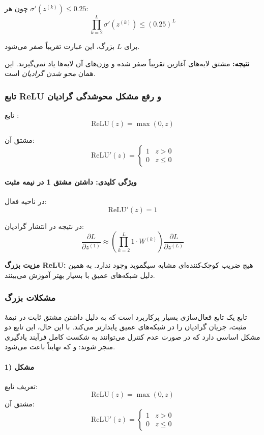 \documentclass{article}
\begin{document}
چون هر $\sigma'(z^{(k)}) \le 0.25$:
\[
\prod_{k=2}^{L} \sigma'(z^{(k)}) 
\le (0.25)^{L}
\]

برای $L$ بزرگ، این عبارت تقریباً صفر می‌شود.

\textbf{نتیجه:}  
مشتق لایه‌های آغازین تقریباً صفر شده و وزن‌های آن لایه‌ها یاد نمی‌گیرند.  
این همان \emph{محو شدن گرادیان} است.

\subsubsection*{تابع ReLU و رفع مشکل محوشدگی گرادیان}

تابع :
\[
\text{ReLU}(z) = \max(0, z)
\]

مشتق آن:
\[
\text{ReLU}'(z) = 
\begin{cases}
	1 & z > 0 \\
	0 & z \le 0
\end{cases}
\]

\paragraph{ویژگی کلیدی: داشتن مشتق 1 در نیمه مثبت}

در ناحیه فعال:
\[
\text{ReLU}'(z) = 1
\]

در نتیجه در انتشار گرادیان:
\[
\frac{\partial L}{\partial z^{(1)}}
\approx 
\left( \prod_{k=2}^{L} 1 \cdot W^{(k)} \right)
\frac{\partial L}{\partial z^{(L)}}
\]

\textbf{مزیت بزرگ ReLU:}  
هیچ ضریب کوچک‌کننده‌ای مشابه  سیگموید وجود ندارد.  
به همین دلیل شبکه‌های عمیق با  بسیار بهتر آموزش می‌بینند.

\subsubsection*{مشکلات بزرگ }

تابع  یک تابع فعال‌سازی بسیار پرکاربرد است که به دلیل داشتن مشتق ثابت در نیمه‌ٔ مثبت، جریان گرادیان را در شبکه‌های عمیق پایدارتر می‌کند. با این حال، این تابع دو مشکل اساسی دارد که در صورت عدم کنترل می‌توانند به شکست کامل فرآیند یادگیری منجر شوند:  و  که نهایتاً باعث  می‌شود.

\paragraph{1) مشکل }
تعریف تابع:
\[
\text{ReLU}(z) = \max(0, z)
\]
مشتق آن:
\[
\text{ReLU}'(z) =
\begin{cases}
	1 & z > 0 \\
	0 & z \le 0
\end{cases}
\]
\end{document}
